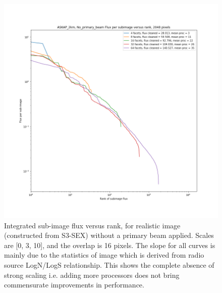 \documentclass[11pt,a4paper,variablewidth]{article}
\begin{document}
\begin{figure}[h]
  \centering
  \includegraphics[width=\textwidth]{./pngs/fluxes_No_primary_beam_ASKAP_2km_2048.png}
  \caption{Integrated sub-image flux versus rank, for realistic image (constructed from S3-SEX) without a primary beam applied. Scales are [0, 3, 10], and the overlap is 16 pixels. The slope for all curves is mainly due to the statistics of image which is derived from radio source LogN/LogS relationship. This shows the complete absence of strong scaling i.e. adding more processors does not bring commensurate improvements in performance.}
  \label{fig:fluxes_without_pb}
\end{figure}
\end{document}
